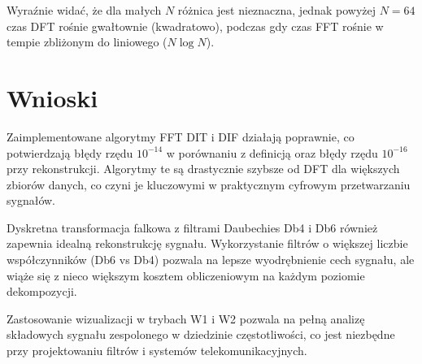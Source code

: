 \documentclass[12pt]{article}
\begin{document}
Wyraźnie widać, że dla małych $N$ różnica jest nieznaczna, jednak powyżej $N=64$ czas DFT rośnie gwałtownie (kwadratowo), podczas gdy czas FFT rośnie w tempie zbliżonym do liniowego ($N \log N$).

\section{Wnioski}
Zaimplementowane algorytmy FFT DIT i DIF działają poprawnie, co potwierdzają błędy rzędu $10^{-14}$ w porównaniu z definicją oraz błędy rzędu $10^{-16}$ przy rekonstrukcji. Algorytmy te są drastycznie szybsze od DFT dla większych zbiorów danych, co czyni je kluczowymi w praktycznym cyfrowym przetwarzaniu sygnałów.

Dyskretna transformacja falkowa z filtrami Daubechies Db4 i Db6 również zapewnia idealną rekonstrukcję sygnału. Wykorzystanie filtrów o większej liczbie współczynników (Db6 vs Db4) pozwala na lepsze wyodrębnienie cech sygnału, ale wiąże się z nieco większym kosztem obliczeniowym na każdym poziomie dekompozycji.

Zastosowanie wizualizacji w trybach W1 i W2 pozwala na pełną analizę składowych sygnału zespolonego w dziedzinie częstotliwości, co jest niezbędne przy projektowaniu filtrów i systemów telekomunikacyjnych.

	
	
\end{document}
